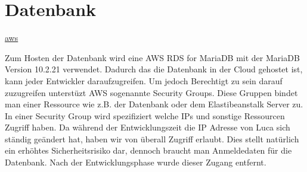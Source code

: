 \chapter{Datenbank}
\href{https://aws.amazon.com/de/rds/mariadb/}{aws}

Zum Hosten der Datenbank wird eine AWS RDS for MariaDB mit der MariaDB Version 10.2.21 verwendet. Dadurch das die Datenbank in der Cloud gehostet ist, kann jeder Entwickler daraufzugreifen. Um jedoch Berechtigt zu sein darauf zuzugreifen unterstüzt AWS sogenannte Security Groups. Diese Gruppen bindet man einer Ressource wie z.B. der Datenbank oder dem Elastibeanstalk Server zu. In einer Security Group wird spezifiziert welche IPs und sonstige Ressourcen Zugriff haben. Da während der Entwicklungszeit die IP Adresse von Luca sich ständig geändert hat, haben wir von überall Zugriff erlaubt. Dies stellt natürlich ein erhöhtes Sicherheitsrisiko dar, dennoch braucht man Anmeldedaten für die Datenbank. Nach der Entwicklungsphase wurde dieser Zugang entfernt.